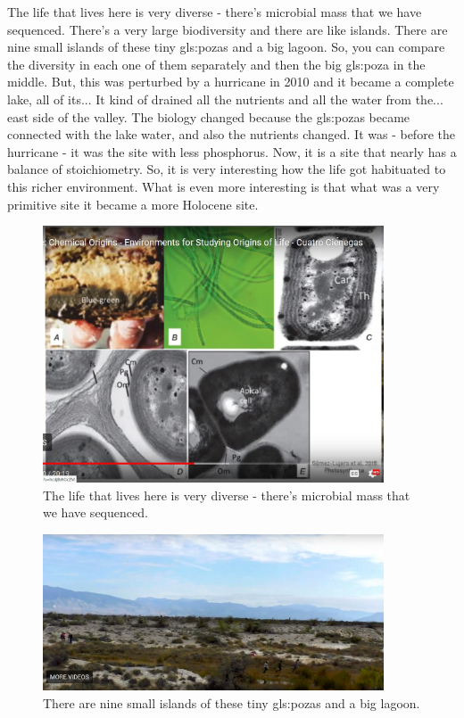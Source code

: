 \documentclass[]{article}
\begin{document}
The life that lives here is very diverse - there's microbial mass that we have sequenced. There's a very large biodiversity and there are like islands. There are nine small islands of these tiny \gls{gls:poza}s and a big lagoon. So, you can compare the diversity in each one of them separately and then the big \gls{gls:poza} in the middle. But, this was perturbed by a hurricane in 2010 and it became a complete lake, all of its... It kind of drained all the nutrients and all the water from the... east side of the valley. The biology changed because the \gls{gls:poza}s became connected 
with the lake water, and also the nutrients changed. It was - before the hurricane - it was the site with less phosphorus. Now, it is a site that nearly has a balance of stoichiometry. So, it is very interesting how the life got habituated to this richer environment. What is even more interesting is that what was a very primitive site it became a more Holocene site.
\begin{figure}[h!]
	\caption{The life that lives here is very diverse - there's microbial mass that we have sequenced.} 
	\includegraphics[width=0.9\textwidth]{CuatroCienegas6}
\end{figure}

\begin{figure}[h!]
	\caption{There are nine small islands of these tiny \gls{gls:poza}s and a big lagoon.} 
	\includegraphics[width=0.9\textwidth]{CuatroCienegas7}
\end{figure}
\end{document}
